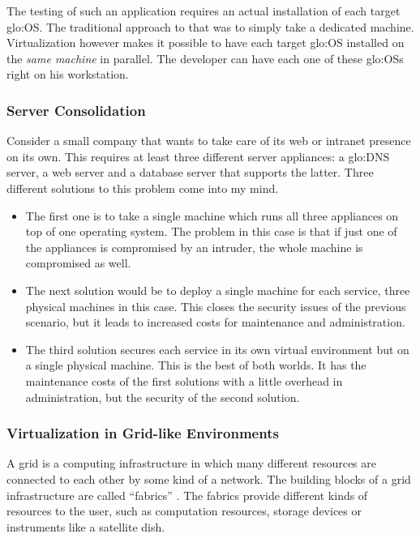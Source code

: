 The testing of such an application requires an actual installation of each
target \gls{glo:OS}. The traditional approach to that was to simply take a
dedicated machine.  Virtualization however  makes it possible to have each
target \gls{glo:OS} installed on  the \emph{same machine} in parallel. The
developer  can  have  each  one   of  these  \gls{glo:OS}s  right  on  his
workstation.

\subsubsection{Server Consolidation}

Consider a  small company that wants to  take care of its  web or intranet
presence  on its  own.   This  requires at  least  three different  server
appliances: a  \gls{glo:DNS} server,  a web server  and a  database server
that supports the  latter. Three different solutions to  this problem come
into my mind.

\begin{itemize}
\item  The first one  is to  take a  single machine  which runs  all three
  appliances on top  of one operating system. The problem  in this case is
  that if  just one of the  appliances is compromised by  an intruder, the
  whole machine is compromised as well.
\item  The next  solution would  be to  deploy a  single machine  for each
  service,  \ie three  physical machines  in this  case.  This  closes the
  security  issues of  the previous  scenario, but  it leads  to increased
  costs for maintenance and administration.
\item  The  third  solution  secures  each  service  in  its  own  virtual
  environment but on  a single physical machine. This is  the best of both
  worlds.  It has  the maintenance  costs of  the first  solutions  with a
  little  overhead  in administration,  but  the  security  of the  second
  solution.
\end{itemize}

\subsubsection{Virtualization in Grid-like Environments}

A grid is a computing infrastructure in which many different resources are
connected to each other by some  kind of a network. The building blocks of
a  grid infrastructure  are called  ``fabrics''  \cite{book/Foster99}. The
fabrics  provide  different  kinds  of  resources to  the  user,  such  as
computation  resources, storage  devices or  instruments like  a satellite
dish.

